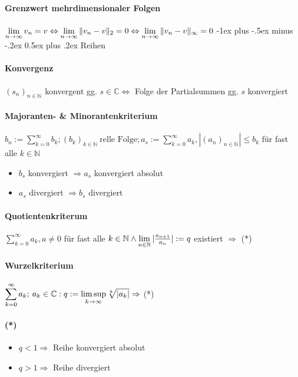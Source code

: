 \documentclass[paper=a4,paper=landscape, fontsize=6pt,DIV=25, twoside]{scrartcl}
\makeatletter
\newcommand{\compl}{\mathbb{C}}
\newcommand{\nat}{\mathbb{N}}
\newcommand{\aseq}{(a_n)_{n \in \nat}}
\newcommand{\srow}{(s_n)_{n \in \nat}}
\renewcommand{\section}{\@startsection{section}{1}{0mm}%
                                {-1ex plus -.5ex minus -.2ex}%
                                {0.5ex plus .2ex}%
                                {\normalfont\large\bfseries}}
\makeatother
\begin{document}
\begin{multicols*}{4}
		\paragraph{Grenzwert mehrdimensionaler Folgen}
		$\lim\limits_{n \rightarrow \infty} v_n = v \Leftrightarrow \lim\limits_{n \rightarrow \infty} \Arrowvert v_n - v\Arrowvert_2 = 0 \Leftrightarrow \lim\limits_{n \rightarrow \infty} \Arrowvert v_n - v\Arrowvert_\infty = 0$
	\section{Reihen}
		\paragraph{Konvergenz} $\srow$ konvergent gg. $s \in \compl \Leftrightarrow$ Folge der Partialsummen gg. $s$ konvergiert
		\paragraph{Majoranten- \& Minorantenkriterium}$\displaystyle b_n := \sum_{k=0}^{\infty} b_k; (b_k)_{k \in \nat}\:\text{relle Folge}; a_s := \sum_{k=0}^{\infty} a_k, |\aseq| \leq b_k$ für fast alle $k \in \nat$
		\begin{itemize}
			\item $b_s$ konvergiert $\Rightarrow a_s$ konvergiert absolut
			\item $a_s$ divergiert $\Rightarrow b_s$ divergiert
		\end{itemize}
		\paragraph{Quotientenkriterum}
		$\displaystyle \sum_{k=0}^{\infty} a_k, a \neq 0$ für fast alle $k \in \nat \wedge \lim\limits_{n \in \nat} \arrowvert \frac{a_{n+1}}{a_n} \arrowvert := q$ existiert $\Rightarrow$ (*)
		\paragraph{Wurzelkriterium}
		$\displaystyle \sum_{k=0}^{\infty} a_k;\:a_k \in \compl: q := \limsup\limits_{k \rightarrow \infty} \sqrt[k]{\arrowvert a_k \arrowvert} \Rightarrow$ (*)
		\paragraph{(*)}
		\begin{itemize}
			\item $q < 1 \Rightarrow$ Reihe konvergiert absolut
			\item $q > 1 \Rightarrow$ Reihe divergiert
		\end{itemize}

\end{multicols*}
\end{document}
